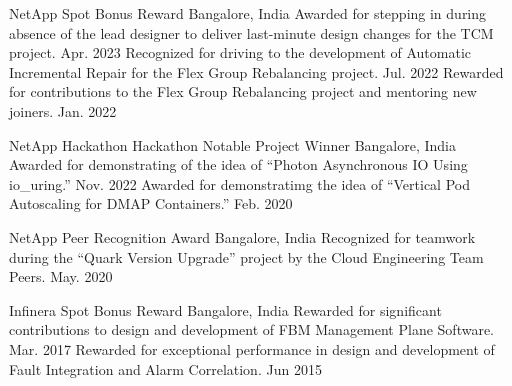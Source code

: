 




\begin{cventries}

  \honorentry
    {NetApp} %
    {Spot Bonus Reward} %
    {Bangalore, India}
    {
	\honorsubentry
	  {Awarded for stepping in during absence of the lead designer to deliver last-minute design changes for the TCM project.}
	  {Apr. 2023}
	\honorsubentry
	  {Recognized for driving to the development of Automatic Incremental Repair for the Flex Group Rebalancing project.}
	  {Jul. 2022}
	\honorsubentry
	  {Rewarded for contributions to the Flex Group Rebalancing project and mentoring new joiners.}
	  {Jan. 2022}
    }

  \honorentry
    {NetApp Hackathon} %
    {Hackathon Notable Project Winner} %
    {Bangalore, India}
    {
	\honorsubentry
	  {Awarded for demonstrating of the idea of ``Photon Asynchronous IO Using io\_uring.''}
	  {Nov. 2022} %
	\honorsubentry
	  {Awarded for demonstratimg the idea of ``Vertical Pod Autoscaling for DMAP Containers.''}
	  {Feb. 2020} %
    }

  \honorentry
    {NetApp} %
    {Peer Recognition Award} %
    {Bangalore, India}
    {
	\honorsubentry
	  {Recognized for teamwork during the ``Quark Version Upgrade'' project by the Cloud Engineering Team Peers.} %
	  {May. 2020} %
    }

  \honorentry
    {Infinera} %
    {Spot Bonus Reward} %
    {Bangalore, India}
    {
	\honorsubentry
	  {Rewarded for significant contributions to design and development of FBM Management Plane Software.}
	  {Mar. 2017} %
	\honorsubentry
	  {Rewarded for exceptional performance in design and development of Fault Integration and Alarm Correlation.} %
	  {Jun 2015} %
    }


\end{cventries}
